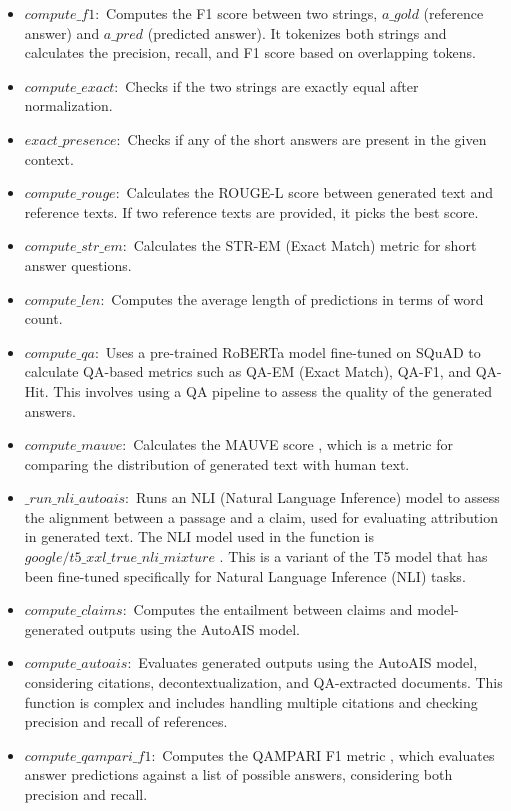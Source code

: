 \begin{itemize}
    \item $compute\_f1:$ Computes the F1 score between two strings, $a\_gold$ (reference answer) and $a\_pred$ (predicted answer). It tokenizes both strings and calculates the precision, recall, and F1 score based on overlapping tokens.

    \item $compute\_exact:$ Checks if the two strings are exactly equal after normalization.

    \item $exact\_presence:$ Checks if any of the short answers are present in the given context.

    \item $compute\_rouge:$ Calculates the ROUGE-L score \cite{ROUGE2.0} between generated text and reference texts. If two reference texts are provided, it picks the best score.

    \item $compute\_str\_em:$ Calculates the STR-EM (Exact Match) metric for short answer questions.

    \item $compute\_len:$ Computes the average length of predictions in terms of word count.

    \item $compute\_qa:$ Uses a pre-trained RoBERTa \cite{RoBERTa} model fine-tuned on SQuAD \cite{SQuAD} to calculate QA-based metrics such as QA-EM (Exact Match), QA-F1, and QA-Hit. This involves using a QA pipeline to assess the quality of the generated answers.

    \item $compute\_mauve:$ Calculates the MAUVE score \cite{MAUVE}, which is a metric for comparing the distribution of generated text with human text.

    \item $\_run\_nli\_autoais:$ Runs an NLI (Natural Language Inference) model to assess the alignment between a passage and a claim, used for evaluating attribution in generated text. The NLI model used in the function is $google/t5\_xxl\_true\_nli\_mixture$ \cite{honovich-etal-2022-true-evaluating}. This is a variant of the T5 model that has been fine-tuned specifically for Natural Language Inference (NLI) tasks.

    \item $compute\_claims:$ Computes the entailment between claims and model-generated outputs using the AutoAIS model.

    \item $compute\_autoais:$ Evaluates generated outputs using the AutoAIS model, considering citations, decontextualization, and QA-extracted documents. This function is complex and includes handling multiple citations and checking precision and recall of references.

    \item $compute\_qampari\_f1:$ Computes the QAMPARI F1 metric \cite{QAMPARI}, which evaluates answer predictions against a list of possible answers, considering both precision and recall.
\end{itemize}

